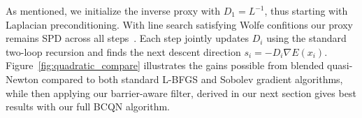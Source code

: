 As mentioned, we initialize the inverse proxy with $D_1=L^{-1}$,
thus starting with Laplacian preconditioning. With line search
satisfying Wolfe confitions our proxy remains SPD across all
steps~\cite{Nocedal:2006:Book}. Each step jointly updates $D_i$
using the standard two-loop recursion and finds the next descent
direction $s_i = -D_i \nabla E(x_i)$.
Figure~\ref{fig:quadratic_compare} illustrates the gains possible from
blended quasi-Newton compared to both standard L-BFGS and Sobolev gradient algorithms, while then applying our barrier-aware filter, derived in our next section gives best results with our
full BCQN algorithm.
